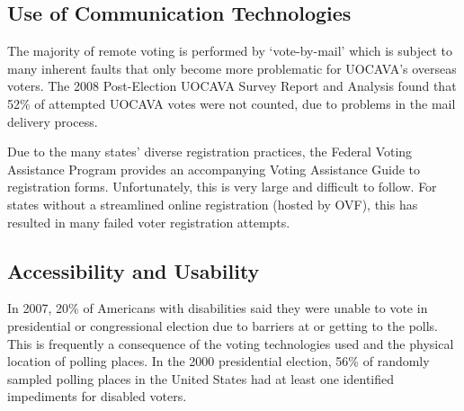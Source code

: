 \subsection{Use of Communication Technologies}
The majority of remote voting is performed by `vote-by-mail' which is
subject to many inherent faults that only become more problematic for UOCAVA's
overseas voters. The 2008 Post-Election UOCAVA Survey Report and Analysis
found that 52\% of attempted UOCAVA votes were not counted, due to problems
in the mail delivery process.


Due to the many states' diverse registration practices, the Federal Voting
Assistance Program provides an accompanying Voting Assistance Guide to
registration forms. Unfortunately, this is very large and difficult to follow.
For states without a streamlined online registration (hosted by OVF), this has
resulted in many failed voter registration attempts.


\subsection{Accessibility and Usability}

In 2007, 20\% of Americans with disabilities said they were unable to vote in
presidential or congressional election due to barriers at or getting to the
polls. This is frequently a consequence of the voting technologies used and the
physical location of polling places. In the 2000 presidential election, 56\% of
randomly sampled polling places in the United States had at least one identified
impediments for disabled voters.

